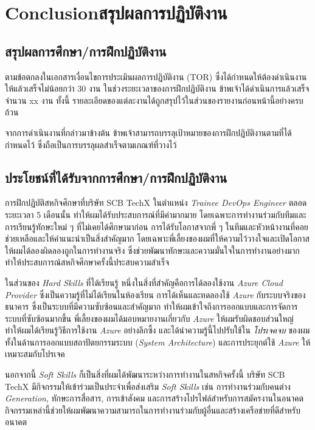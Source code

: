 \chapter{\ifenglish Conclusion\else สรุปผลการปฏิบัติงาน\fi}

\section{สรุปผลการศึกษา/การฝึกปฏิบัติงาน} ตามข้อตกลงในเอกสารเงื่อนไขการประเมินผลการปฏิบัติงาน (TOR) ซึ่งได้กำหนดให้ต้องดำเนินงานให้แล้วเสร็จไม่น้อยกว่า 30 งาน ในช่วงระยะเวลาของการฝึกปฏิบัติงาน ข้าพเจ้าได้ดำเนินการแล้วเสร็จจำนวน xx งาน ทั้งนี้ รายละเอียดของแต่ละงานได้ถูกสรุปไว้ในส่วนของรายงานก่อนหน้านี้อย่างครบถ้วน

จากการดำเนินงานที่กล่าวมาข้างต้น ข้าพเจ้าสามารถบรรลุเป้าหมายของการฝึกปฏิบัติงานตามที่ได้กำหนดไว้ ซึ่งถือเป็นการบรรลุผลสำเร็จตามเกณฑ์ที่วางไว้

\section{ประโยชน์ที่ได้รับจากการศึกษา/การฝึกปฏิบัติงาน}
การฝึกปฏิบัติสหกิจศึกษาที่บริษัท SCB TechX ในตำแหน่ง \textit{Trainee DevOps Engineer} ตลอดระยะเวลา 5 เดือนนั้น ทำให้ผมได้รับประสบการณ์ที่มีค่ามากมาย โดยเฉพาะการทำงานร่วมกับทีมและการเรียนรู้ทักษะใหม่ ๆ ที่ไม่เคยได้ศึกษามาก่อน การได้รับโอกาสจากพี่ ๆ ในทีมและหัวหน้างานที่คอยช่วยเหลือและให้คำแนะนำเป็นสิ่งสำคัญมาก โดยเฉพาะพี่เลี้ยงของผมที่ให้ความไว้วางใจและเปิดโอกาสให้ผมได้ลองผิดลองถูกในการทำงานจริง ซึ่งช่วยพัฒนาทักษะและความมั่นใจในการทำงานอย่างมาก ทำให้ประสบการณ์สหกิจศึกษาครั้งนี้ประสบความสำเร็จ

ในส่วนของ \textit{Hard Skills} ที่ได้เรียนรู้ หนึ่งในสิ่งที่สำคัญคือการได้ลองใช้งาน \textit{Azure Cloud Provider} ซึ่งเป็นความรู้ที่ไม่ได้เรียนในห้องเรียน การได้เห็นและทดลองใช้ \textit{Azure} กับระบบจริงของธนาคาร ซึ่งเป็นระบบที่มีความซับซ้อนและสำคัญมาก ทำให้ผมเข้าใจถึงการออกแบบและการจัดการระบบที่ซับซ้อนมากขึ้น พี่เลี้ยงของผมได้มอบหมายงานเกี่ยวกับ \textit{Azure} ให้ผมรับผิดชอบส่วนใหญ่ ทำให้ผมได้เรียนรู้วิธีการใช้งาน \textit{Azure} อย่างลึกซึ้ง และได้นำความรู้นี้ไปปรับใช้ใน \textit{โปรเจคจบ} ของผม ทั้งในด้านการออกแบบสถาปัตยกรรมระบบ (\textit{System Architecture}) และการประยุกต์ใช้ \textit{Azure} ให้เหมาะสมกับโปรเจค

นอกจากนี้ \textit{Soft Skills} ก็เป็นสิ่งที่ผมได้พัฒนาระหว่างการทำงานในสหกิจครั้งนี้ บริษัท SCB TechX มีกิจกรรมให้เข้าร่วมเป็นประจำเพื่อส่งเสริม \textit{Soft Skills} เช่น การทำงานร่วมกับคนต่าง \textit{Generation}, ทักษะการสื่อสาร, การเข้าสังคม และการสร้างโปรไฟล์สำหรับการสมัครงานในอนาคต กิจกรรมเหล่านี้ช่วยให้ผมพัฒนาความสามารถในการทำงานร่วมกับผู้อื่นและสร้างเครือข่ายที่ดีสำหรับอนาคต

